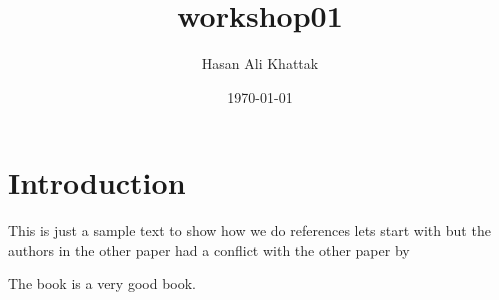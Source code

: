 \documentclass{article}
\title{workshop01}
\author{Hasan Ali Khattak}
\date{\today}
\begin{document}
\maketitle

\section{Introduction}
This is just a sample text to show how we do references lets start with \cite{tzu2008art} but the authors in the other paper \cite{baburao2022novel} had a conflict with the other paper by \cite{da2022fog}

The book \citep{tzu2005illustrated} is a very good book.



\end{document}
